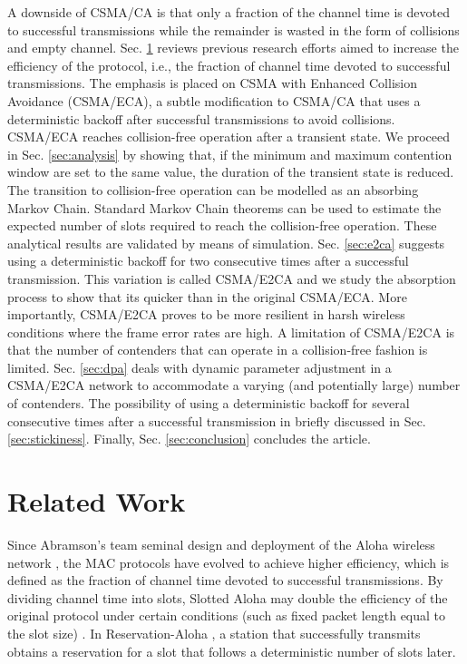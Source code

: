 \documentclass[journal]{IEEEtran}
\begin{document}
A downside of CSMA/CA is that only a fraction of the channel time is devoted to successful transmissions while the remainder is wasted in the form of collisions and empty channel. Sec. \ref{sec:related_work} reviews previous research efforts aimed to increase the efficiency of the protocol, i.e., the fraction of channel time devoted to successful transmissions. The emphasis is placed on CSMA with Enhanced Collision Avoidance (CSMA/ECA), a subtle modification to CSMA/CA that uses a deterministic backoff after successful transmissions to avoid collisions. CSMA/ECA reaches collision-free operation after a transient state. We proceed in Sec. \ref{sec:analysis} by showing that, if the minimum and maximum contention window are set to the same value, the duration of the transient state is reduced. The transition to collision-free operation can be modelled as an absorbing Markov Chain. Standard Markov Chain theorems can be used to estimate the expected number of slots required to reach the collision-free operation. These analytical results are validated by means of simulation. Sec. \ref{sec:e2ca} suggests using a deterministic backoff for two consecutive times after a successful transmission. This variation is called CSMA/E2CA and we study the absorption process to show that its quicker than in the original CSMA/ECA. More importantly, CSMA/E2CA proves to be more resilient in harsh wireless conditions where the frame error rates are high. A limitation of CSMA/E2CA is that the number of contenders that can operate in a collision-free fashion is limited. Sec. \ref{sec:dpa} deals with dynamic parameter adjustment in a CSMA/E2CA network to accommodate a varying (and potentially large) number of contenders. The possibility of using a deterministic backoff for several consecutive times after a successful transmission in briefly discussed in Sec. \ref{sec:stickiness}. Finally, Sec. \ref{sec:conclusion} concludes the article.




\section{Related Work}
\label{sec:related_work}
Since Abramson's team seminal design and deployment of the Aloha wireless network \cite{abramson1970asa,abramson2009asw}, the MAC protocols have evolved to achieve higher efficiency, which is defined as the fraction of channel time devoted to successful transmissions. By dividing channel time into slots, Slotted Aloha may double the efficiency of the original protocol under certain conditions (such as fixed packet length equal to the slot size) \cite{rom1990map,roberts1975aps,tanenbaum1988cn}. In Reservation-Aloha \cite{crowther1973sbc}, a station that successfully transmits obtains a reservation for a slot that follows a deterministic number of slots later. 
\end{document}
